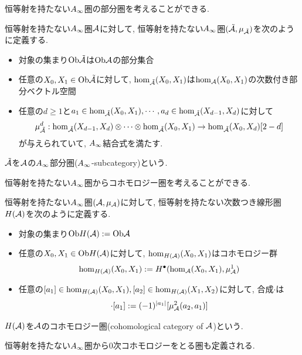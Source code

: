 \documentclass[uplatex, a4paper, 14Q, dvipdfmx]{jsarticle}
\begin{document}
恒等射を持たない$A_{\infty}$圏の部分圏を考えることができる. 

\begin{definition}
  恒等射を持たない$A_{\infty}$圏$\mathcal{A}$に対して, 恒等射を持たない$A_{\infty}$圏$(\tilde{\mathcal{A}},\mu_{\tilde{\mathcal{A}}})$を次のように定義する. 
  \begin{itemize}
    \item 対象の集まり$\mathrm{Ob}\tilde{\mathcal{A}}$は$\mathrm{Ob}\mathcal{A}$の部分集合
    \item 任意の$X_0,X_1 \in \mathrm{Ob}\tilde{\mathcal{A}}$に対して, $\hom_{\tilde{\mathcal{A}}}(X_0,X_1)$は$\hom_{\mathcal{A}}(X_0,X_1)$の次数付き部分ベクトル空間
    \item 任意の$d \geq 1$と$a_1 \in \hom_{\tilde{\mathcal{A}}}(X_0,X_1), \cdots, a_d \in \hom_{\tilde{\mathcal{A}}}(X_{d-1},X_d)$に対して
    \begin{align*}
      \mu^d_{\tilde{\mathcal{A}}} : \hom_{\tilde{\mathcal{A}}}(X_{d-1},X_d) \otimes \cdots \otimes \hom_{\tilde{\mathcal{A}}}(X_0,X_1) \to \hom_{\tilde{\mathcal{A}}}(X_0,X_d)[2-d]
    \end{align*}
    が与えられていて, $A_{\infty}$結合式を満たす. 
  \end{itemize}
  $\tilde{\mathcal{A}}$を$\mathcal{A}$の$A_{\infty}$部分圏($A_{\infty}$-subcategory)という. 
\end{definition}


恒等射を持たない$A_{\infty}$圏からコホモロジー圏を考えることができる. 

\begin{definition}[コホモロジー圏]
  恒等射を持たない$A_{\infty}$圏$(\mathcal{A},\mu_{\mathcal{A}})$に対して, 恒等射を持たない次数つき線形圏$H(\mathcal{A})$を次のように定義する. 
  \begin{itemize}
    \item 対象の集まり$ \mathrm{Ob} H(\mathcal{A}) := \mathrm{Ob}\mathcal{A}$
    \item 任意の$X_0, X_1 \in \mathrm{Ob} H(\mathcal{A})$に対して, $\hom_{H(\mathcal{A})}(X_0,X_1)$はコホモロジー群
    \begin{align*}
      \hom_{H(\mathcal{A})}(X_0,X_1) := H^\bullet(\hom_{\mathcal{A}}(X_0,X_1), \mu^1_{\mathcal{A}})
    \end{align*}
    \item 任意の$[a_1] \in \hom_{H(\mathcal{A})}(X_0,X_1), [a_2] \in \hom_{H(\mathcal{A})}(X_1,X_2)$に対して, 合成$\cdot$は
    \begin{align*}
      [a_2] \cdot [a_1] := (-1)^{|a_1|} [\mu^2_\A(a_2,a_1)]
    \end{align*}
  \end{itemize}
  $H(\mathcal{A})$を$\mathcal{A}$のコホモロジー圏(cohomological category of $\mathcal{A}$)という. 
\end{definition}

恒等射を持たない$A_{\infty}$圏から$0$次コホモロジーをとる圏も定義される. 
\end{document}
